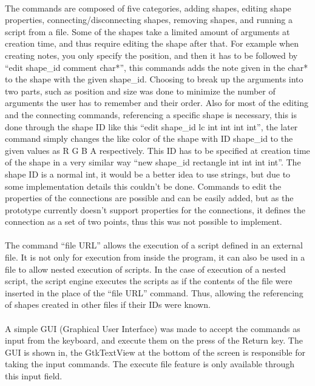 \paragraph{} 
The commands are composed of five categories, adding shapes, editing shape properties, connecting/disconnecting shapes, removing shapes, and running a script from a file.
Some of the shapes take a limited amount of arguments at creation time, and thus require editing the shape after that. For example when creating notes, you only specify the position, and then it has to be followed by ``edit shape\_id comment char*'', this commands adds the note given in the char* to the shape with the given shape\_id. Choosing to break up the arguments into two parts, such as position and size was done to minimize the number of arguments the user has to remember and their order. Also for most of the editing and the connecting commands, referencing a specific shape is necessary, this is done through the shape ID like this ``edit shape\_id lc int int int int'', the later command simply changes the like color of the shape with ID shape\_id to the given values as R G B A respectively. This ID has to be specified at creation time of the shape in a very similar way ``new shape\_id rectangle int int int int''. The shape ID is a normal int, it would be a better idea to use strings, but due to some implementation details this couldn't be done. Commands to edit the properties of the connections are possible and can be easily added, but as the prototype currently doesn't support properties for the connections, it defines the connection as a set of two points, thus this was not possible to implement.

\paragraph{}
The command ``file URL'' allows the execution of a script defined in an external file. It is not only for execution from inside the program, it can also be used in a file to allow nested execution of scripts. In the case of execution of a nested script, the script engine executes the scripts as if the contents of the file were inserted in the place of the ``file URL'' command. Thus, allowing the referencing of shapes created in other files if their IDs were known.

\paragraph{}
A simple GUI (Graphical User Interface) was made to accept the commands as input from the keyboard, and execute them on the press of the Return key. The GUI is shown in, the GtkTextView at the bottom of the screen is responsible for taking the input commands. The execute file feature is only available through this input field.

